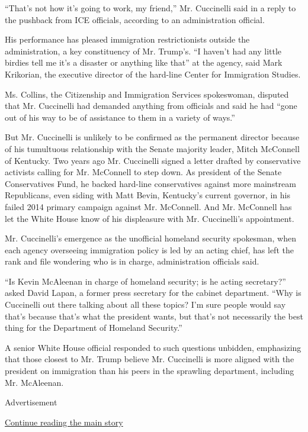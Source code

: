 ``That's not how it's going to work, my friend,'' Mr. Cuccinelli said in
a reply to the pushback from ICE officials, according to an
administration official.

His performance has pleased immigration restrictionists outside the
administration, a key constituency of Mr. Trump's. ``I haven't had any
little birdies tell me it's a disaster or anything like that'' at the
agency, said Mark Krikorian, the executive director of the hard-line
Center for Immigration Studies.

Ms. Collins, the Citizenship and Immigration Services spokeswoman,
disputed that Mr. Cuccinelli had demanded anything from officials and
said he had ``gone out of his way to be of assistance to them in a
variety of ways.''

But Mr. Cuccinelli is unlikely to be confirmed as the permanent director
because of his tumultuous relationship with the Senate majority leader,
Mitch McConnell of Kentucky. Two years ago Mr. Cuccinelli signed a
letter drafted by conservative activists calling for Mr. McConnell to
step down. As president of the Senate Conservatives Fund, he backed
hard-line conservatives against more mainstream Republicans, even siding
with Matt Bevin, Kentucky's current governor, in his failed 2014 primary
campaign against Mr. McConnell. And Mr. McConnell has let the White
House know of his displeasure with Mr. Cuccinelli's appointment.

Mr. Cuccinelli's emergence as the unofficial homeland security
spokesman, when each agency overseeing immigration policy is led by an
acting chief, has left the rank and file wondering who is in charge,
administration officials said.

``Is Kevin McAleenan in charge of homeland security; is he acting
secretary?'' asked David Lapan, a former press secretary for the cabinet
department. ``Why is Cuccinelli out there talking about all these
topics? I'm sure people would say that's because that's what the
president wants, but that's not necessarily the best thing for the
Department of Homeland Security.''

A senior White House official responded to such questions unbidden,
emphasizing that those closest to Mr. Trump believe Mr. Cuccinelli is
more aligned with the president on immigration than his peers in the
sprawling department, including Mr. McAleenan.

Advertisement

\protect\hyperlink{after-bottom}{Continue reading the main story}

